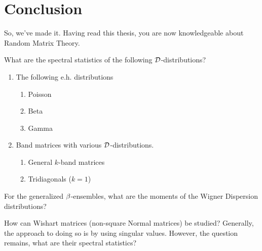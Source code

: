 
  \chapter*{Conclusion}

\medskip

So, we've made it. Having read this thesis, you are now knowledgeable about Random Matrix Theory.

\newpage

\medskip
 What are the spectral statistics of the following $\mathcal{D}$-distributions?

\begin{enumerate}
  \item The following e.h. distributions
    \begin{enumerate}
      \item Poisson
      \item Beta
      \item Gamma
    \end{enumerate}
  \item Band matrices with various $\mathcal{D}$-distributions.
    \begin{enumerate}
      \item General $k$-band matrices
      \item Tridiagonals ($k = 1$)
    \end{enumerate}
\end{enumerate}

\medskip
 For the generalized $\beta$-ensembles, what are the moments of the Wigner Dispersion distributions?

\medskip
 How can Wishart matrices (non-square Normal matrices) be studied?
Generally, the approach to doing so is by using singular values. However, the question remains, what are their spectral statistics?
